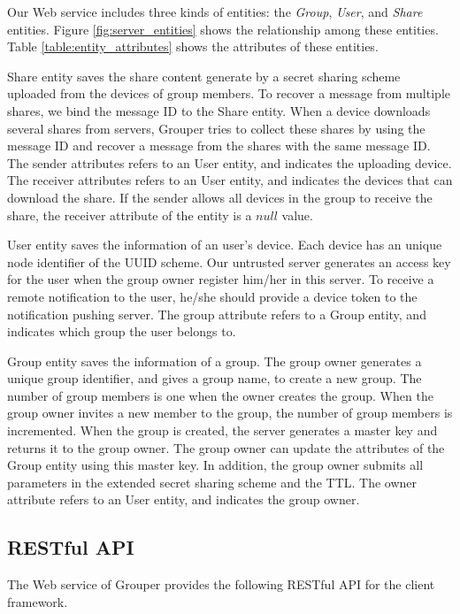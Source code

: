 \documentclass[a4paper,11pt]{report}
\begin{document}
Our Web service includes three kinds of entities: the \emph{Group}, \emph{User}, and \emph{Share} entities.
Figure \ref{fig:server_entities} shows the relationship among these entities.
Table \ref{table:entity_attributes} shows the attributes of these entities.

Share entity saves the share content generate by a secret sharing scheme uploaded from the devices of group members.
To recover a message from multiple shares, we bind the message ID to the Share entity.
When a device downloads several shares from servers, Grouper tries to collect these shares by using the message ID and recover a message from the shares with the same message ID.
The sender attributes refers to an User entity, and indicates the uploading device.
The receiver attributes refers to an User entity, and indicates the devices that can download the share.
If the sender allows all devices in the group to receive the share, the receiver attribute of the entity is a $null$ value.

User entity saves the information of an user's device.
Each device has an unique node identifier of the UUID scheme.
Our untrusted server generates an access key for the user when the group owner register him/her in this server.
To receive a remote notification to the user, he/she should provide a device token to the notification pushing server.
The group attribute refers to a Group entity, and indicates which group the user belongs to.

Group entity saves the information of a group.
The group owner generates a unique group identifier, and gives a group name, to create a new group.
The number of group members is one when the owner creates the group.
When the group owner invites a new member to the group, the number of group members is incremented.
When the group is created, the server generates a master key and returns it to the group owner.
The group owner can update the attributes of the Group entity using this master key.
In addition, the group owner submits all parameters in the extended secret sharing scheme and the TTL.
The owner attribute refers to an User entity, and indicates the group owner.

\subsection{RESTful API}

The Web service of Grouper provides the following RESTful API for the client framework.
\end{document}

